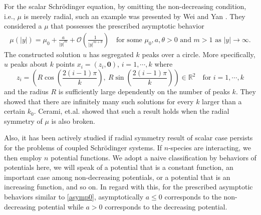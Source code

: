 \documentclass{amsart}
\theoremstyle{definition}
\theoremstyle{remark}
\numberwithin{equation}{section}
\begin{document}
For the scalar Schr\"odinger equation, by omitting the non-decreasing condition, i.e., $\mu$ is merely radial, such an example was presented by Wei and Yan \cite{wei_yan_2014}. They considered a $\mu$ that possesses the prescribed asymptotic behavior
\begin{align} \label{asymp0}
 \mu(|y|) = \mu_0 + \frac{a}{|y|^m} + \mathcal{O}\left(\frac{1}{|y|^{m+\theta}}\right) \quad \text{for some $\mu_0,a,\theta>0$ and $m>1$ as $|y| \rightarrow \infty$}.
\end{align}
The constructed solution $u$ has segregated $k$ peaks over a circle. More specifically, $u$ peaks about $k$ points $x_i=(z_i,\mathbf{0})$, $i=1,\cdots,k$ where
$$z_i= \left( R \cos\left(\frac{2(i-1)\pi}{k}\right), ~R \sin\left(\frac{2(i-1)\pi}{k}\right)\right)\in \mathbb{R}^2 \quad \text{for $i=1,\cdots,k$}$$
and the radius $R$ is sufficiently large dependently on the number of peaks $k$. They showed that there are infinitely many such solutions for every $k$ larger than a certain $k_0$. Cerami, et.al. \cite{cerami_passaseo_solimini_2015} showed that such a result holds when the radial symmetry of $\mu$ is also broken. 

Also, it has been actively studied if radial symmetry result of scalar case persists for the problems of coupled Schr\"odinger systems. If $n$-species are interacting, we then employ $n$ potential functions. We adopt a naive classification by behaviors of potentials here, we will speak of a potential that is a constant function, an important case among non-decreasing potentials, or a potential that is an increasing function, and so on. In regard with this, for the prescribed asymptotic behaviors similar to \eqref{asymp0},  asymptotically $a\le 0$ corresponds to the non-decreasing potential while $a>0$ corresponds to the decreasing potential.
\end{document}
